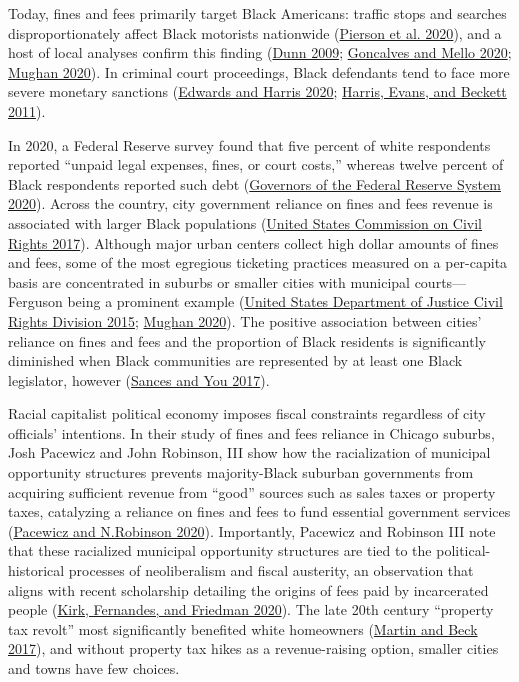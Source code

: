 \documentclass[
  12pt,
]{article}
\begin{document}
Today, fines and fees primarily target Black Americans: traffic stops and searches disproportionately affect Black motorists nationwide (\protect\hyperlink{ref-Pierson2020}{Pierson et al. 2020}), and a host of local analyses confirm this finding (\protect\hyperlink{ref-Dunn2009}{Dunn 2009}; \protect\hyperlink{ref-Goncalves2020}{Goncalves and Mello 2020}; \protect\hyperlink{ref-Mughan2020}{Mughan 2020}). In criminal court proceedings, Black defendants tend to face more severe monetary sanctions (\protect\hyperlink{ref-Edwards2020}{Edwards and Harris 2020}; \protect\hyperlink{ref-Harris2011}{Harris, Evans, and Beckett 2011}).

In 2020, a Federal Reserve survey found that five percent of white respondents reported ``unpaid legal expenses, fines, or court costs,'' whereas twelve percent of Black respondents reported such debt (\protect\hyperlink{ref-BoardofGovernorsoftheFederalReserveSystem2020}{Governors of the Federal Reserve System 2020}). Across the country, city government reliance on fines and fees revenue is associated with larger Black populations (\protect\hyperlink{ref-UnitedStatesCommissiononCivilRights2017}{United States Commission on Civil Rights 2017}). Although major urban centers collect high dollar amounts of fines and fees, some of the most egregious ticketing practices measured on a per-capita basis are concentrated in suburbs or smaller cities with municipal courts---Ferguson being a prominent example (\protect\hyperlink{ref-UnitedStatesDepartmentofJusticeCivilRightsDivision2015}{United States Department of Justice Civil Rights Division 2015}; \protect\hyperlink{ref-Mughan2020}{Mughan 2020}). The positive association between cities' reliance on fines and fees and the proportion of Black residents is significantly diminished when Black communities are represented by at least one Black legislator, however (\protect\hyperlink{ref-Sances2017}{Sances and You 2017}).

Racial capitalist political economy imposes fiscal constraints regardless of city officials' intentions. In their study of fines and fees reliance in Chicago suburbs, Josh Pacewicz and John Robinson, III show how the racialization of municipal opportunity structures prevents majority-Black suburban governments from acquiring sufficient revenue from ``good'' sources such as sales taxes or property taxes, catalyzing a reliance on fines and fees to fund essential government services (\protect\hyperlink{ref-Pacewicz2020}{Pacewicz and N.Robinson 2020}). Importantly, Pacewicz and Robinson III note that these racialized municipal opportunity structures are tied to the political-historical processes of neoliberalism and fiscal austerity, an observation that aligns with recent scholarship detailing the origins of fees paid by incarcerated people (\protect\hyperlink{ref-Kirk2020}{Kirk, Fernandes, and Friedman 2020}). The late 20th century ``property tax revolt'' most significantly benefited white homeowners (\protect\hyperlink{ref-Martin2017}{Martin and Beck 2017}), and without property tax hikes as a revenue-raising option, smaller cities and towns have few choices.
\end{document}
